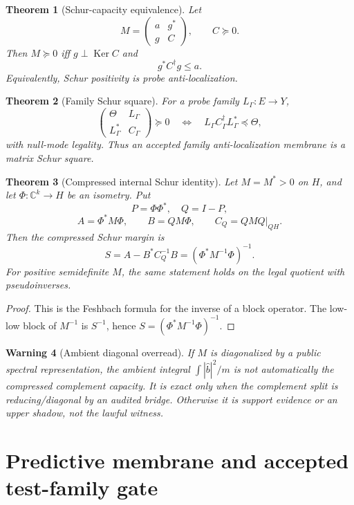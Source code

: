 \documentclass[11pt]{article}
\newtheorem{theorem}{Theorem}[section]
\newtheorem{warning}[theorem]{Warning}
\DeclareMathOperator{\kernel}{Ker}
\begin{document}
\begin{theorem}[Schur-capacity equivalence]
Let
\[
  M=\begin{pmatrix}a&g^*\\ g&C\end{pmatrix},
  \qquad C\succeq0.
\]
Then \(M\succeq0\) iff \(g\perp\kernel C\) and
\[
  g^*C^\dagger g\le a.
\]
Equivalently, Schur positivity is probe anti-localization.
\end{theorem}

\begin{theorem}[Family Schur square]
For a probe family \(L_\Gamma:E\to Y\),
\[
  \begin{pmatrix}
    \Theta & L_\Gamma\\
    L_\Gamma^* & C_\Gamma
  \end{pmatrix}\succeq0
  \quad\Longleftrightarrow\quad
  L_\Gamma C_\Gamma^\dagger L_\Gamma^*\preceq\Theta,
\]
with null-mode legality.  Thus an accepted family anti-localization membrane is a matrix Schur square.
\end{theorem}

\begin{theorem}[Compressed internal Schur identity]
Let \(M=M^*>0\) on \(H\), and let \(\Phi:\mathbb C^k\to H\) be an isometry.  Put
\[
  P=\Phi\Phi^*,\quad Q=I-P,
\]
\[
  A=\Phi^*M\Phi,
  \qquad B=QM\Phi,
  \qquad C_Q=QMQ|_{QH}.
\]
Then the compressed Schur margin is
\[
  S=A-B^*C_Q^{-1}B=(\Phi^*M^{-1}\Phi)^{-1}.
\]
For positive semidefinite \(M\), the same statement holds on the legal quotient with pseudoinverses.
\end{theorem}

\begin{proof}
This is the Feshbach formula for the inverse of a block operator.  The low-low block of \(M^{-1}\) is \(S^{-1}\), hence \(S=(\Phi^*M^{-1}\Phi)^{-1}\).
\end{proof}

\begin{warning}[Ambient diagonal overread]
If \(M\) is diagonalized by a public spectral representation, the ambient integral \(\int|\widehat b|^2/m\) is not automatically the compressed complement capacity.  It is exact only when the complement split is reducing/diagonal by an audited bridge.  Otherwise it is support evidence or an upper shadow, not the lawful witness.
\end{warning}

\section{Predictive membrane and accepted test-family gate}
\end{document}
